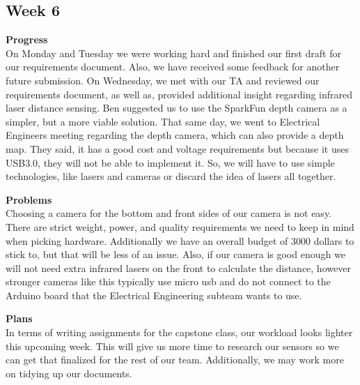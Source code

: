 \documentclass[onecolumn, oneside, letterpaper, draftclsnofoot, 10pt, compsoc]{IEEEtran}
\begin{document}
\subsection{Week 6}
\noindent \textbf{Progress}\\
On Monday and Tuesday we were working hard and finished our first draft for our requirements document. Also, we have received some feedback for another future submission. On Wednesday, we met with our TA and reviewed our requirements document, as well as, provided additional insight regarding infrared laser distance sensing. Ben suggested us to use the SparkFun depth camera as a simpler, but a more viable solution. That same day, we went to Electrical Engineers meeting regarding the depth camera, which can also provide a depth map. They said, it has a good cost and voltage requirements but because it uses USB3.0, they will not be able to implement it. So, we will have to use simple technologies, like lasers and cameras or discard the idea of lasers all together.

\noindent \textbf{Problems}\\
Choosing a camera for the bottom and front sides of our camera is not easy. There are strict weight, power, and quality requirements we need to keep in mind when picking hardware. Additionally we have an overall budget of 3000 dollars to stick to, but that will be less of an issue. Also, if our camera is good enough we will not need extra infrared lasers on the front to calculate the distance, however stronger cameras like this typically use micro usb and do not connect to the Arduino board that the Electrical Engineering subteam wants to use.

\noindent \textbf{Plans}\\
In terms of writing assignments for the capstone class, our workload looks lighter this upcoming week. This will give us more time to research our sensors so we can get that finalized for the rest of our team. Additionally, we may work more on tidying up our documents.
\end{document}
